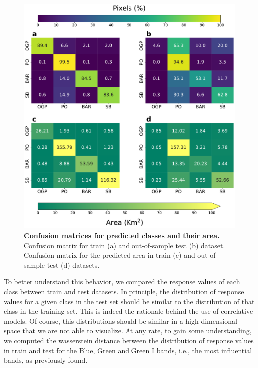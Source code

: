 \begin{figure}[H]
    \centering
    \includegraphics[width=\textwidth]{Figures/Confusion_matrix.pdf}
    \caption[Confusion matrices for predicted classes and their
        area]{\textbf{Confusion matrices for predicted classes and their area.}
        Confusion
        matrix for train (a) and out-of-sample test (b)
        dataset. Confusion matrix for the predicted area in train (c) and
        out-of-sample
        test (d) datasets.}
    \label{fig:confusion_matrix}
\end{figure}

To better understand this behavior, we compared the response values of each
class between train and test datasets. In principle, the distribution of
response values for a given class in the test set should be similar to the
distribution of that class in the training set. This is indeed the rationale
behind the use of correlative models. Of course, this distributions should be
similar in a high dimensional space that we are not able to visualize. At any
rate, to gain some understanding, we computed the wasserstein distance between
the distribution of response values in train and test for the Blue, Green and
Green I bands, i.e., the most influential bands, as previously found.

